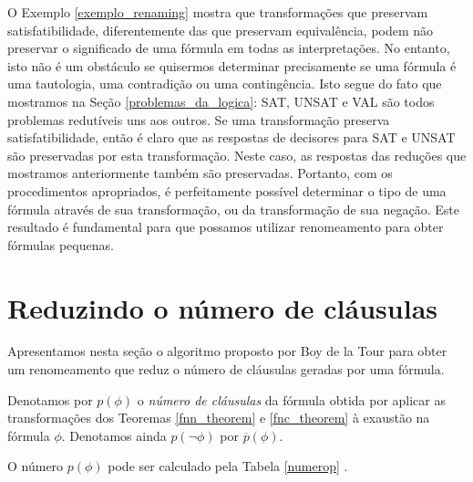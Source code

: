 O Exemplo \ref{exemplo_renaming} mostra que transformações que preservam satisfatibilidade, diferentemente das que preservam equivalência, podem não preservar o significado de uma fórmula em todas as interpretações. No entanto, isto não é um obstáculo se quisermos determinar precisamente se uma fórmula é uma tautologia, uma contradição ou uma contingência. Isto segue do fato que mostramos na Seção \ref{problemas_da_logica}: SAT, UNSAT e VAL são todos problemas redutíveis uns aos outros. Se uma transformação preserva satisfatibilidade, então é claro que as respostas de decisores para SAT e UNSAT são preservadas por esta transformação. Neste caso, as respostas das reduções que mostramos anteriormente também são preservadas. Portanto, com os procedimentos apropriados, é perfeitamente possível determinar o tipo de uma fórmula através de sua transformação, ou da transformação de sua negação. Este resultado é fundamental para que possamos utilizar renomeamento para obter fórmulas pequenas.

\section{Reduzindo o número de cláusulas}

\indent

Apresentamos nesta seção o algoritmo proposto por Boy de la Tour para obter um renomeamento que reduz o número de cláusulas geradas por uma fórmula.

\begin{definition}
	Denotamos por $p(\phi)$ o \emph{número de cláusulas} da fórmula obtida por aplicar as transformações dos Teoremas \ref{fnn_theorem} e \ref{fnc_theorem} à exaustão na fórmula $\phi$. Denotamos ainda $p(\neg \phi)$ por $\overline{p}(\phi)$.
\end{definition}

O número $p(\phi)$ pode ser calculado pela Tabela \ref{numerop} \cite{de1992optimality}.

